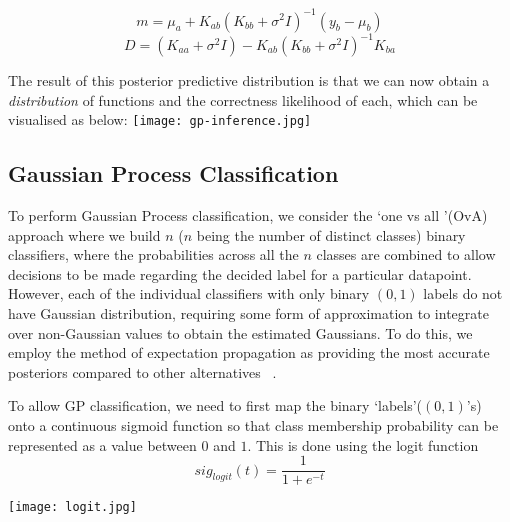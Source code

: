 \documentclass[10pt,sts]{article}
\begin{document}
\begin{multicols}{2}
    $$ m = \mu_a + K_{ab} (K_{bb} + \sigma^2I)^{-1} (y_b - \mu_b) $$
    $$ D = (K_{aa} + \sigma^2I) - K_{ab} (K_{bb}+\sigma^2I)^{-1} K_{ba} $$

    The result of this posterior predictive distribution is that we can now obtain a \textit{distribution} of functions and the correctness likelihood of each, which can be visualised as below:
    \texttt{[image: gp-inference.jpg]}

    \subsection{Gaussian Process Classification} 
    To perform Gaussian Process classification, we consider the \lq one vs all \rq (OvA) approach where we build $n$ ($n$ being the number of distinct classes) binary classifiers, where the probabilities across all the $n$ classes are combined to allow decisions to be made regarding the decided label for a particular datapoint. However, each of the individual classifiers with only binary $(0, 1)$ labels do not have Gaussian distribution, requiring some form of approximation to integrate over non-Gaussian values to obtain the estimated Gaussians. To do this, we employ the method of expectation propagation as providing the most accurate posteriors compared to other alternatives ~\citep{nickisch08}. 

    To allow GP classification, we need to first map the binary \lq labels\rq ($(0, 1)$'s) onto a continuous sigmoid function so that class membership probability can be represented as a value between $0$ and $1$. This is done using the logit function $$sig_{logit}(t) = \frac{1}{1+e^{-t}}$$
    
    \texttt{[image: logit.jpg]}


\end{multicols}
\end{document}
